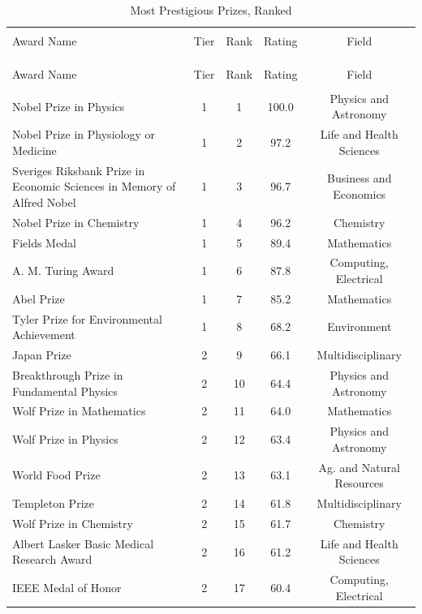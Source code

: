 \setlength{\tabcolsep}{4pt}\begin{longtable}{>{\raggedright\arraybackslash}p{7.2cm}cccc} \caption{Most Prestigious Prizes, Ranked} \label{listOfPrizes} 
\\[-1.8ex]\hline 
\hline \\[-1.8ex] 
Award Name & Tier & Rank & Rating & Field \\ 
\hline \\[-1.8ex] 
\endfirsthead
\multicolumn{5}{l}{\small\textit{(Table~\ref{listOfPrizes} continued)}} \\[2pt]
\hline \hline \\[-1.8ex]
Award Name & Tier & Rank & Rating & Field \\ 
\hline \\[-1.8ex] 
\endhead
Nobel Prize in Physics & 1 & 1 & 100.0 & Physics and Astronomy \\ 
Nobel Prize in Physiology or Medicine & 1 & 2 & 97.2 & Life and Health Sciences \\ 
Sveriges Riksbank Prize in Economic Sciences in Memory of Alfred Nobel & 1 & 3 & 96.7 & Business and Economics \\ 
Nobel Prize in Chemistry & 1 & 4 & 96.2 & Chemistry \\ 
Fields Medal & 1 & 5 & 89.4 & Mathematics \\ 
A. M. Turing Award & 1 & 6 & 87.8 & Computing, Electrical \\ 
Abel Prize & 1 & 7 & 85.2 & Mathematics \\ 
Tyler Prize for Environmental Achievement & 1 & 8 & 68.2 & Environment \\ 
Japan Prize & 2 & 9 & 66.1 & Multidisciplinary \\ 
Breakthrough Prize in Fundamental Physics & 2 & 10 & 64.4 & Physics and Astronomy \\ 
Wolf Prize in Mathematics & 2 & 11 & 64.0 & Mathematics \\ 
Wolf Prize in Physics & 2 & 12 & 63.4 & Physics and Astronomy \\ 
World Food Prize & 2 & 13 & 63.1 & Ag. and Natural Resources \\ 
Templeton Prize & 2 & 14 & 61.8 & Multidisciplinary \\ 
Wolf Prize in Chemistry & 2 & 15 & 61.7 & Chemistry \\ 
Albert Lasker Basic Medical Research Award & 2 & 16 & 61.2 & Life and Health Sciences \\ 
IEEE Medal of Honor & 2 & 17 & 60.4 & Computing, Electrical \\ 

\end{longtable}
